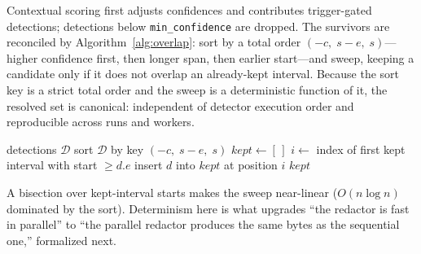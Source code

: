 \documentclass[conference]{IEEEtran}
\begin{document}
Contextual scoring first adjusts confidences and contributes trigger-gated
detections; detections below \texttt{min\_confidence} are dropped. The survivors
are reconciled by Algorithm~\ref{alg:overlap}: sort by a total order
$(-c,\; s-e,\; s)$---higher confidence first, then longer span, then earlier
start---and sweep, keeping a candidate only if it does not overlap an
already-kept interval. Because the sort key is a strict total order and the sweep
is a deterministic function of it, the resolved set is canonical: independent of
detector execution order and reproducible across runs and workers.

\begin{algorithm}[t]
\caption{Deterministic overlap resolution}
\label{alg:overlap}
\begin{algorithmic}[1]
\Require detections $\mathcal{D}$
\State sort $\mathcal{D}$ by key $(-c,\; s-e,\; s)$ 
\State $\textit{kept}\gets[\,]$ 
  \State $i\gets$ index of first kept interval with start $\ge d.e$
    \State insert $d$ into $\textit{kept}$ at position $i$
  \EndIf
\EndFor
\State \Return $\textit{kept}$
\end{algorithmic}
\end{algorithm}

A bisection over kept-interval starts makes the sweep near-linear
($O(n\log n)$ dominated by the sort). Determinism here is what upgrades ``the
redactor is fast in parallel'' to ``the parallel redactor produces the same bytes
as the sequential one,'' formalized next.
\end{document}
